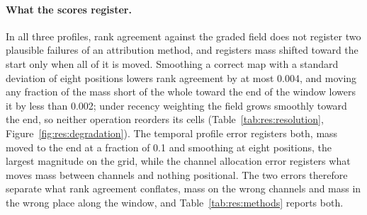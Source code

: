 \documentclass{article}
\begin{document}
\paragraph{What the scores register.}
In all three profiles, rank agreement against the graded field does not register two plausible failures of an attribution method, and registers mass shifted toward the start only when all of it is moved. Smoothing a correct map with a standard deviation of eight positions lowers rank agreement by at most 0.004, and moving any fraction of the mass short of the whole toward the end of the window lowers it by less than 0.002; under recency weighting the field grows smoothly toward the end, so neither operation reorders its cells (Table~\ref{tab:res:resolution}, Figure~\ref{fig:res:degradation}). The temporal profile error registers both, mass moved to the end at a fraction of 0.1 and smoothing at eight positions, the largest magnitude on the grid, while the channel allocation error registers what moves mass between channels and nothing positional. The two errors therefore separate what rank agreement conflates, mass on the wrong channels and mass in the wrong place along the window, and Table~\ref{tab:res:methods} reports both.
\end{document}
